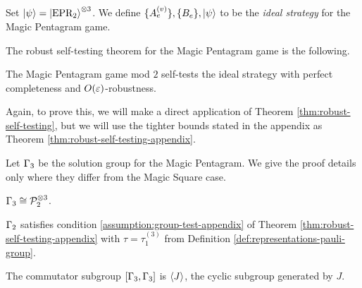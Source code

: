\begin{definition}
	Set $\ket\psi = \ket{\text{EPR}_2}^{\otimes 3}$. We define $\{A_e^{(v)}\}, \{B_e \}, \ket\psi$ to be the \emph{ideal strategy} for the Magic Pentagram game.
\end{definition}

The robust self-testing theorem for the Magic Pentagram game is the following.
\begin{thm}\label{thm:robust-self-testing-pentagram}
The Magic Pentagram game mod $2$ self-tests the ideal strategy with perfect completeness and $O(\varepsilon)$-robustness.
\end{thm}
Again, to prove this, we will make a direct application of Theorem \ref{thm:robust-self-testing}, but we will use the tighter bounds stated in the appendix as Theorem \ref{thm:robust-self-testing-appendix}.



Let $\Gamma_3$ be the solution group for the Magic Pentagram. We give the proof details only where they differ from the Magic Square case. 


\begin{prop}\label{prop:solution-group-pentagram}
	$\Gamma_3\cong \mathcal{P}_2^{\otimes 3}$. 
\end{prop}
\begin{cor}\label{cor:G3-satisfies-conditions-4-5}
	$\Gamma_2$ satisfies condition \eqref{assumption:group-test-appendix} of Theorem \ref{thm:robust-self-testing-appendix} with $\tau = \tau_1^{(3)}$ from Definition \ref{def:representations-pauli-group}.
\end{cor}


\begin{lemma}\label{lemma:commutator-subgroup-pentagram}
	The commutator subgroup $[\Gamma_3,\Gamma_3]$ is $\Braket J$, 
	the cyclic subgroup generated by $J$.
\end{lemma}

